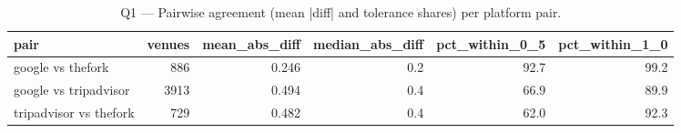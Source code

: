 \begin{table}[ht]
\centering
\caption{Q1 — Pairwise agreement (mean |diff| and tolerance shares) per platform pair.}
\label{tab:q1_pairwise_agreement}
{\tiny
\begin{tabular}{lrrrrr}
\toprule
pair & venues & mean\_abs\_diff & median\_abs\_diff & pct\_within\_0\_5 & pct\_within\_1\_0 \\
\midrule
google vs thefork & 886 & 0.246 & 0.2 & 92.7 & 99.2 \\
google vs tripadvisor & 3913 & 0.494 & 0.4 & 66.9 & 89.9 \\
tripadvisor vs thefork & 729 & 0.482 & 0.4 & 62.0 & 92.3 \\
\bottomrule
\end{tabular}
}
\end{table}

